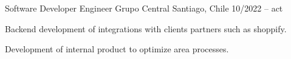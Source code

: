 \begin{cventries}

\cventry
{Software Developer Engineer}
{Grupo Central}
{Santiago, Chile} 
{10/2022 – act}
{

  \begin{cvitems} %

    \item {Backend development of integrations with clients partners such as shoppify.}
    \item {Development of internal product to optimize area processes. } 

  \end{cvitems}

}


\end{cventries}
